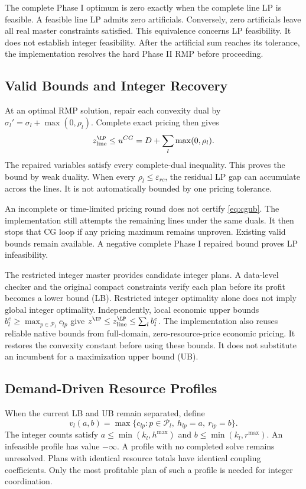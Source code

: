 The complete Phase I optimum is zero exactly when the complete line LP is feasible. A feasible line LP admits zero artificials. Conversely, zero artificials leave all real master constraints satisfied. This equivalence concerns LP feasibility. It does not establish integer feasibility. After the artificial sum reaches its tolerance, the implementation resolves the hard Phase II RMP before proceeding.

\subsection{Valid Bounds and Integer Recovery}
At an optimal RMP solution, repair each convexity dual by $\sigma_l'=\sigma_l+\max(0,\rho_l)$. Complete exact pricing then gives
\begin{equation}
z_{\rm line}^{\LP}\leq u^{CG}=D+\sum_l\max(0,\rho_l).\label{eq:cgub}
\end{equation}
The repaired variables satisfy every complete-dual inequality. This proves the bound by weak duality. When every $\rho_l\leq\varepsilon_{rc}$, the residual LP gap can accumulate across the lines. It is not automatically bounded by one pricing tolerance.

An incomplete or time-limited pricing round does not certify \eqref{eq:cgub}. The implementation still attempts the remaining lines under the same duals. It then stops that CG loop if any pricing maximum remains unproven. Existing valid bounds remain available. A negative complete Phase I repaired bound proves LP infeasibility.

The restricted integer master provides candidate integer plans. A data-level checker and the original compact constraints verify each plan before its profit becomes a lower bound (LB). Restricted integer optimality alone does not imply global integer optimality. Independently, local economic upper bounds $b_l^e\geq\max_{p\in\mathcal P_l}c_{lp}$ give $z^{\IP}\leq z_{\rm line}^{\LP}\leq\sum_l b_l^e$. The implementation also reuses reliable native bounds from full-domain, zero-resource-price economic pricing. It restores the convexity constant before using these bounds. It does not substitute an incumbent for a maximization upper bound (UB).

\subsection{Demand-Driven Resource Profiles}
When the current LB and UB remain separated, define
\begin{equation}
v_l(a,b)=\max\{c_{lp}:p\in\mathcal P_l,\ h_{lp}=a,\ r_{lp}=b\}.\label{eq:profile}
\end{equation}
The integer counts satisfy $a\leq\min(k_l,h^{\max})$ and $b\leq\min(k_l,r^{\max})$. An infeasible profile has value $-\infty$. A profile with no completed solve remains unresolved. Plans with identical resource totals have identical coupling coefficients. Only the most profitable plan of such a profile is needed for integer coordination.

